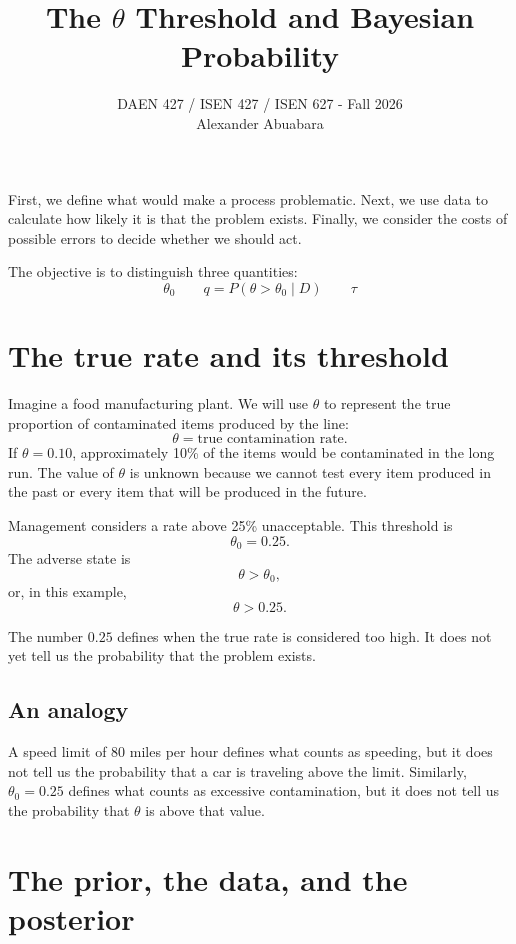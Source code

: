 \documentclass[11pt,letter]{article}
\title{\textcolor{aggiemaroon}{The $\theta$ Threshold and Bayesian Probability}}
\author{DAEN 427 / ISEN 427 / ISEN 627 - Fall 2026\\[3ex]
        Alexander Abuabara}
\date{}
\begin{document}
\maketitle

\begin{ideia}
First, we define what would make a process problematic.
Next, we use data to calculate how likely it is that the problem exists.
Finally, we consider the costs of possible errors to decide whether we should
act.
\end{ideia}

The objective is to distinguish three quantities:
\[
\boxed{\theta_0\qquad q=P(\theta>\theta_0\mid D)\qquad \tau}
\]

\section{The true rate and its threshold}

Imagine a food manufacturing plant. We will use $\theta$ to represent the true
proportion of contaminated items produced by the line:
\[
\theta=\text{true contamination rate}.
\]
If $\theta=0.10$, approximately 10\% of the items would be contaminated in the
long run. The value of $\theta$ is unknown because we cannot test every item
produced in the past or every item that will be produced in the future.

Management considers a rate above 25\% unacceptable. This threshold is
\[
\theta_0=0.25.
\]
The adverse state is
\[
\theta>\theta_0,
\]
or, in this example,
\[
\theta>0.25.
\]

\begin{ideia}
The number $0.25$ defines when the true rate is considered too high. It does not
yet tell us the probability that the problem exists.
\end{ideia}

\subsection{An analogy}

A speed limit of 80 miles per hour defines what counts as speeding, but it does
not tell us the probability that a car is traveling above the limit. Similarly,
$\theta_0=0.25$ defines what counts as excessive contamination, but it does not
tell us the probability that $\theta$ is above that value.

\section{The prior, the data, and the posterior}
\end{document}
